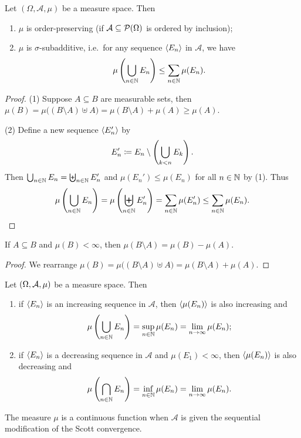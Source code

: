 \begin{proposition} \label{measureProperties}
Let $(\Omega, \mathcal{A}, \mu)$ be a measure space. Then
\begin{enumerate}
\item $\mu$ is order-preserving (if $\mathcal{A}\subseteq \operatorname{\mathcal{P}}(\Omega)$ is ordered by inclusion);
\item $\mu$ is $\sigma$-subadditive, i.e.\ for any sequence $\left\langle E_n \right\rangle$ in $\mathcal{A}$, we have
\[ \mu\left(\bigcup_{n\in\mathbb{N}}E_n\right) \leq \sum_{n\in\mathbb{N}}\mu(E_n). \]
\end{enumerate}
\end{proposition}
\begin{proof}
(1) Suppose $A \subseteq B$ are measurable sets, then $\mu(B) = \mu\big((B\setminus A) \uplus A\big) = \mu(B\setminus A) + \mu(A) \geq \mu(A)$.

(2) Define a new sequence $\left\langle E_n' \right\rangle$ by
\[ E_n' \coloneqq E_n\setminus \left(\bigcup_{k<n}E_k\right). \]
Then $\bigcup_{n\in\mathbb{N}}E_n = \biguplus_{n\in\mathbb{N}}E_n'$ and $\mu(E_n')\leq \mu(E_n)$ for all $n\in \mathbb{N}$ by (1). Thus
\[ \mu\left(\bigcup_{n\in\mathbb{N}}E_n\right) = \mu\left(\biguplus_{n\in\mathbb{N}}E_n'\right) =  \sum_{n\in\mathbb{N}}\mu(E'_n) \leq \sum_{n\in\mathbb{N}}\mu(E_n). \]
\end{proof}
\begin{corollary} \label{measureSetDifference}
If $A\subseteq B$ and $\mu(B) < \infty$, then $\mu(B\setminus A) = \mu(B)-\mu(A)$.
\end{corollary}
\begin{proof}
We rearrange $\mu(B) = \mu\big((B\setminus A) \uplus A\big) = \mu(B\setminus A) + \mu(A)$.
\end{proof}
\begin{proposition}
Let $\left( \Omega, \mathcal{A}, \mu \right)$ be a measure space. Then
\begin{enumerate}
\item if $\left\langle E_n \right\rangle$ is an increasing sequence in $\mathcal{A}$, then $\left\langle \mu(E_n) \right\rangle$ is also increasing and
\[ \mu\left(\bigcup_{n\in\mathbb{N}}E_n\right) = \sup_{n\in\mathbb{N}}\mu(E_n) = \lim_{n\to\infty}\mu(E_n); \]
\item if $\left\langle E_n \right\rangle$ is a decreasing sequence in $\mathcal{A}$ and $\mu(E_1)<\infty$, then $\left\langle \mu(E_n) \right\rangle$ is also decreasing and
\[ \mu\left(\bigcap_{n\in\mathbb{N}}E_n\right) = \inf_{n\in\mathbb{N}}\mu(E_n) = \lim_{n\to\infty}\mu(E_n). \]
\end{enumerate}
\end{proposition}
\begin{corollary}
The measure $\mu$ is a continuous function when $\mathcal{A}$ is given the sequential modification of the Scott convergence.
\end{corollary}


